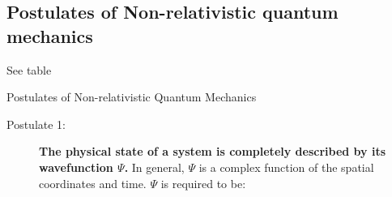 \documentclass[11pt]{article}
\begin{document}
\subsection{Postulates of Non-relativistic quantum mechanics}
\label{sec-2-2}
See table
\begin{table}
\begin{center}
    \caption{\large{Postulates of Non-relativistic Quantum Mechanics}}
   \begin{description}
    \item[Postulate 1:] {{\bf The physical state of a system is completely described by
        its wavefunction $\Psi$.}  In general, $\Psi$ is a complex function of the spatial
      coordinates and time.  $\Psi$ is required to be:}


\end{description}
\end{center}
\end{table}
\end{document}
